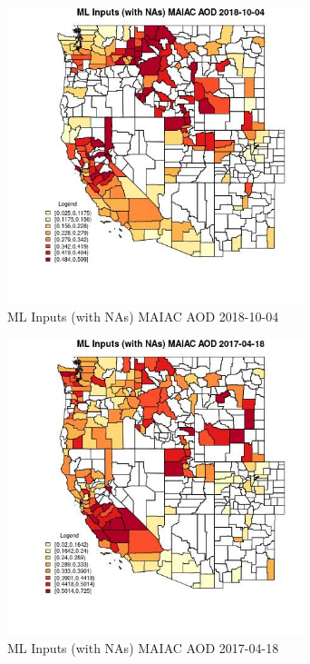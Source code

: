\clearpage 

\begin{figure} 
\centering  
\includegraphics[width=0.77\textwidth]{Code_Outputs/Report_ML_input_PM25_Step4_part_f_de_duplicated_aveswNAs_CountyMAIAC_AODMean2018-10-04.jpg} 
\caption{\label{fig:Report_ML_input_PM25_Step4_part_f_de_duplicated_aveswNAsCountyMAIAC_AODMean2018-10-04}ML Inputs (with NAs) MAIAC AOD 2018-10-04} 
\end{figure} 
 

\begin{figure} 
\centering  
\includegraphics[width=0.77\textwidth]{Code_Outputs/Report_ML_input_PM25_Step4_part_f_de_duplicated_aveswNAs_CountyMAIAC_AODMean2017-04-18.jpg} 
\caption{\label{fig:Report_ML_input_PM25_Step4_part_f_de_duplicated_aveswNAsCountyMAIAC_AODMean2017-04-18}ML Inputs (with NAs) MAIAC AOD 2017-04-18} 
\end{figure} 
 

